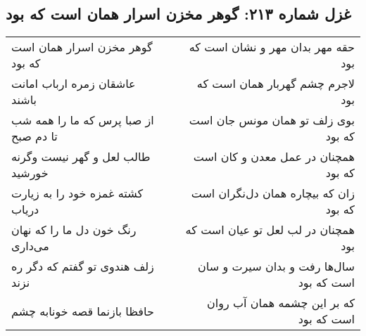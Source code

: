 \begin{center}
\section*{غزل شماره ۲۱۳: گوهر مخزن اسرار همان است که بود}
\label{sec:sh213}
\begin{longtable}{l p{0.5cm} r}
گوهر مخزن اسرار همان است که بود
&&
حقه مهر بدان مهر و نشان است که بود
\\
عاشقان زمره ارباب امانت باشند
&&
لاجرم چشم گهربار همان است که بود
\\
از صبا پرس که ما را همه شب تا دم صبح
&&
بوی زلف تو همان مونس جان است که بود
\\
طالب لعل و گهر نیست وگرنه خورشید
&&
همچنان در عمل معدن و کان است که بود
\\
کشته غمزه خود را به زیارت دریاب
&&
زان که بیچاره همان دل‌نگران است که بود
\\
رنگ خون دل ما را که نهان می‌داری
&&
همچنان در لب لعل تو عیان است که بود
\\
زلف هندوی تو گفتم که دگر ره نزند
&&
سال‌ها رفت و بدان سیرت و سان است که بود
\\
حافظا بازنما قصه خونابه چشم
&&
که بر این چشمه همان آب روان است که بود
\\
\end{longtable}
\end{center}

